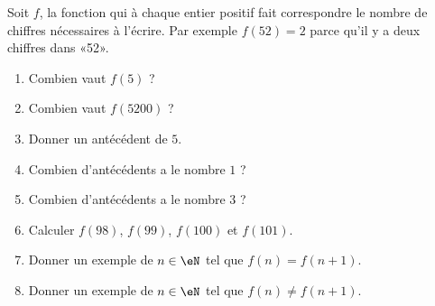 
\begin{exercice}\label{exoSeconde-0054}

    Soit \( f\), la fonction qui à chaque entier positif fait correspondre le nombre de chiffres nécessaires à l'écrire. Par exemple \( f(52)=2\) parce qu'il y a deux chiffres dans «52».
    \begin{multicols}{2}
        \begin{enumerate}
            \item
            Combien vaut \( f(5)\) ?
        \item
            Combien vaut \( f(5200)\) ?
        \item
            Donner un antécédent de \( 5\).
        \item
            Combien d'antécédents a le nombre \( 1\) ?
        \item
            Combien d'antécédents a le nombre \( 3\) ?
        \item
            Calculer \( f(98)\), \( f(99)\), \( f(100)\) et \( f(101)\).
        \item
            Donner un exemple de \( n\in \eN\) tel que \( f(n)=f(n+1)\). 
        \item
            Donner un exemple de \( n\in \eN\) tel que \( f(n)\neq f(n+1)\).
        \end{enumerate}
    \end{multicols}

\end{exercice}
